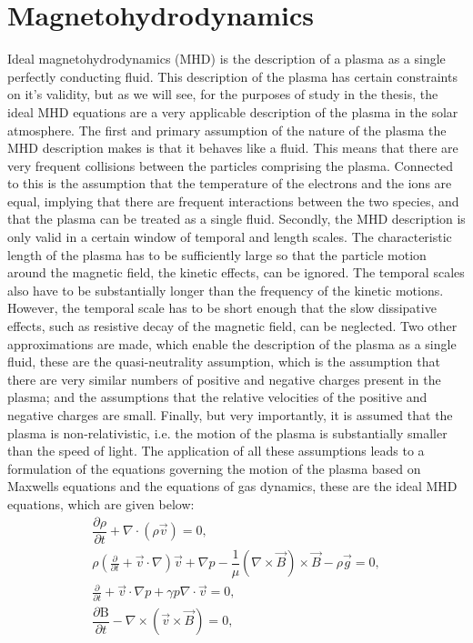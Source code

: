 \section{Magnetohydrodynamics}\label{sec:MHD}

Ideal magnetohydrodynamics (MHD) is the description of a plasma as a single perfectly conducting fluid.
This description of the plasma has certain constraints on it's validity, but as we will see, for the purposes of study in the thesis, the ideal MHD equations are a very applicable description of the plasma in the solar atmosphere.
The first and primary assumption of the nature of the plasma the MHD description makes is that it behaves like a fluid.
This means that there are very frequent collisions between the particles comprising the plasma.
Connected to this is the assumption that the temperature of the electrons and the ions are equal, implying that there are frequent interactions between the two species, and that the plasma can be treated as a single fluid.
Secondly, the MHD description is only valid in a certain window of temporal and length scales.
The characteristic length of the plasma has to be sufficiently large so that the particle motion around the magnetic field, the kinetic effects, can be ignored.
The temporal scales also have to be substantially longer than the frequency of the kinetic motions.
However, the temporal scale has to be short enough that the slow dissipative effects, such as resistive decay of the magnetic field, can be neglected.
Two other approximations are made, which enable the description of the plasma as a single fluid, these are the quasi-neutrality assumption, which is the assumption that there are very similar numbers of positive and negative charges present in the plasma; and the assumptions that the relative velocities of the positive and negative charges are small.
Finally, but very importantly, it is assumed that the plasma is non-relativistic, i.e. the motion of the plasma is substantially smaller than the speed of light.
The application of all these assumptions leads to a formulation of the equations governing the motion of the plasma based on Maxwells equations and the equations of gas dynamics, these are the ideal MHD equations, which are given below:
\newcommand{\condev}{\left(\frac{\partial}{\partial t} + \vec{v}\cdot\nabla\right)}
\begin{align}                                                         
    \dfrac{\partial \rho }{\partial t} + \nabla \cdot (\rho \vec{v}) =       
    0,
    \tag{Mass Conservation}\\
    \rho  \condev\vec{v} + \nabla p - \dfrac{1}{\mu}(\nabla \times \vec{B}) \times \vec{B} - \rho \vec{g} = 0,
    \tag{Equation of Motion}\\
    \frac{\partial}{\partial t} + \vec{v}\cdot\nabla p + \gamma p \nabla \cdot \vec{v}  = 0,
    \tag{Energy Equation}\\
    \dfrac{\partial \mathrm{B}}{\partial t} - \nabla \times (\vec{v} \times \vec{B}) = 0,
    \tag{Induction Equation}               
\end{align}

